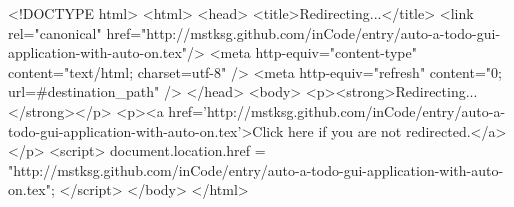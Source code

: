<!DOCTYPE html>
<html>
<head>
<title>Redirecting...</title>
<link rel="canonical" href="http://mstksg.github.com/inCode/entry/auto-a-todo-gui-application-with-auto-on.tex"/>
<meta http-equiv="content-type" content="text/html; charset=utf-8" />
<meta http-equiv="refresh" content="0; url=#{destination_path}" />
</head>
<body>
  <p><strong>Redirecting...</strong></p>
  <p><a href='http://mstksg.github.com/inCode/entry/auto-a-todo-gui-application-with-auto-on.tex'>Click here if you are not redirected.</a></p>
  <script>
    document.location.href = "http://mstksg.github.com/inCode/entry/auto-a-todo-gui-application-with-auto-on.tex";
  </script>
</body>
</html>
